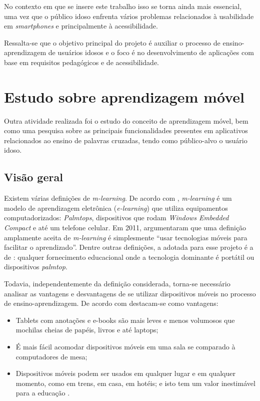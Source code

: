 No contexto em que se insere este trabalho isso se torna ainda mais essencial, uma vez que o público idoso enfrenta vários problemas relacionados à usabilidade em \textit{smartphones} \citep{dificuldadesIdosos} e principalmente à acessibilidade.

Ressalta-se que o objetivo principal do projeto é auxiliar o processo de ensino-aprendizagem de usuários idosos e o foco é no desenvolvimento de aplicações com base em requisitos pedagógicos e de acessibilidade.

\section{Estudo sobre aprendizagem móvel}\label{sec:estudos_ap_movel} 
Outra atividade realizada foi o estudo do conceito de aprendizagem móvel, bem como uma pesquisa sobre as principais funcionalidades presentes em aplicativos relacionados ao ensino de palavras cruzadas, tendo como público-alvo o usuário idoso.

\subsection{Visão geral}
Existem várias definições de \textit{m-learning}.
De acordo com \cite{Quinn2000}, \textit{m-learning} é um modelo de aprendizagem eletrônica (\textit{e-learning}) que utiliza equipamentos computadorizados: \textit{Palmtops}, dispositivos que rodam \textit{Windows Embedded Compact} e até um telefone celular.
Em 2011, \cite{hwang2011research} argumentaram que uma definição amplamente aceita de \textit{m-learning} é simplesmente ``usar tecnologias móveis para facilitar o aprendizado''. Dentre outras definições, a adotada para esse projeto é a de \cite{traxler2005defining}: qualquer fornecimento educacional onde a tecnologia dominante é portátil ou dispositivos \textit{palmtop}.

Todavia, independentemente da definição considerada, torna-se necessário analisar as vantagens e desvantagens de se utilizar dispositivos móveis no processo de ensino-aprendizagem. De acordo com \cite{RICHAMEHTA2016} destacam-se como vantagens: 

\begin{itemize}
    \item Tablets com anotações e e-books são mais leves e menos volumosos que mochilas cheias de papéis, livros e até laptops;
    \item É mais fácil acomodar dispositivos móveis em uma sala se comparado à computadores de mesa;
    \item Dispositivos móveis podem ser usados em qualquer lugar e em qualquer momento, como em trens, em casa, em hotéis; e isto tem um valor inestimável para a educação \citep{CarmaMaia2008}.
\end{itemize}

